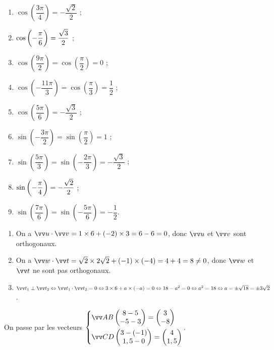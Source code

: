 \documentclass[a4paper,11pt]{article}
\begin{document}
\begin{multicols}{3}
	\begin{enumerate}
			\item $\cos\left( \dfrac{3\pi}{4}\right) = -\dfrac{\sqrt{2}}{2}$ ;
			\item $\cos\left( -\dfrac{\vphantom{1}\pi}{6}\right) = \dfrac{\sqrt{3}}{2}$ ;
			\item $\cos\left( \dfrac{9\pi}{2}\right) = \cos\left( \dfrac{\pi}{2}\right) = 0$ ;
			\item $\cos\left( -\dfrac{11\pi}{3}\right) = \cos\left( \dfrac{\pi}{3}\right) = \dfrac12$ ;
			\item $\cos\left( \dfrac{5\pi}{6}\right) = -\dfrac{\sqrt{3}}{2}$ ;
			\item $\sin\left( -\dfrac{3\pi}{2}\right) = \sin\left( \dfrac{\pi}{2}\right) = 1$ ;
			\item $\sin\left( \dfrac{5\pi}{3}\right) = \sin\left( -\dfrac{2\pi}{3}\right) = -\dfrac{\sqrt{3}}{2}$ ;
			\item $\sin\left( -\dfrac{\vphantom{1}\pi}{4}\right) = -\dfrac{\sqrt{2}}{2}$ ;
			\item $\sin\left( \dfrac{7\pi}{6}\right) = \sin\left( -\dfrac{5\pi}{6}\right) = -\dfrac12$.
		\end{enumerate}
\end{multicols}

\medskip


\begin{enumerate}
	\item On a $\vect{u}\cdot\vect{v}=1 \times 6 + (-2) \times 3 = 6 - 6 = 0$, donc $\vect{u}$ et $\vect{v}$ sont orthogonaux.
	\item On a $\vect{w}\cdot\vect{t}=\sqrt{2} \times 2\sqrt{2} + (-1) \times (-4) = 4 + 4 = 8 \neq 0$, donc $\vect{w}$ et $\vect{t}$ ne sont pas orthogonaux.
	\item $\vect{t_1} \perp \vect{t_2} \ssi \vect{t_1}\cdot\vect{t_2} = 0 \ssi 3 \times 6 +a \times (-a) = 0 \ssi 18 -a^2 = 0 \ssi a^2=18 \ssi a=\pm \sqrt{18} = \pm 3\sqrt{2}$.
\end{enumerate}

\pagebreak


\medskip

On passe par les vecteurs $\begin{dcases} \vect{AB} \begin{pmatrix} 8-5 \\ -5-3 \end{pmatrix} = \begin{pmatrix} 3 \\ -8 \end{pmatrix} \\ \vect{CD} \begin{pmatrix} 3-(-1) \\ 1,5-0 \end{pmatrix} = \begin{pmatrix} 4 \\ 1,5 \end{pmatrix} \end{dcases}$.
\end{document}

